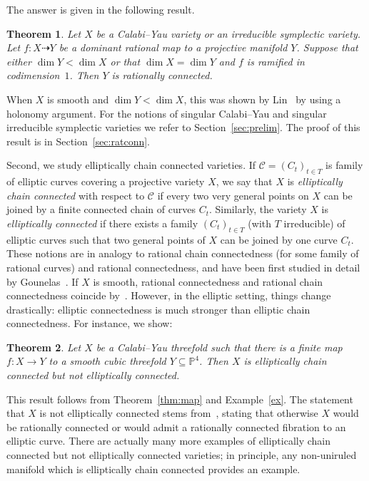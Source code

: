 \documentclass[11pt]{article}
\newtheorem{theo}{Theorem}[section]
\theoremstyle{definition}
\numberwithin{equation}{section}
\numberwithin{figure}{section}
\numberwithin{table}{section}
\newcommand{\PS}{\mathbb{P}}
\newcommand\sC{\mathcal{C}}
\begin{document}
The answer is given in the following result.

\begin{theo}\label{thm:main1}
Let $X$ be a Calabi--Yau variety or an irreducible symplectic variety. Let $f\colon X \dasharrow Y$ be a dominant rational map to a projective manifold $Y$. Suppose that either $\dim Y < \dim X$ or that $\dim X = \dim Y$ and $f$ is ramified in codimension~$1$. Then $Y$ is rationally connected.
\end{theo}

When $X$ is smooth and $\dim Y < \dim X$, this was shown by Lin~\cite[Theorem~1.4]{Lin15} by using a holonomy argument. For the notions of singular Calabi--Yau and singular irreducible symplectic varieties we refer to Section~\ref{sec:prelim}. The proof of this result is in Section~\ref{sec:ratconn}.


Second, we study elliptically chain connected varieties. If $\sC = (C_t)_{t\in T}$ is family of elliptic curves covering a projective variety $X$, we say that $X$ is \emph{elliptically chain connected} with respect to $\sC$ if every two very general points on $X$ can be joined by a finite connected chain of curves $C_t$. Similarly, the variety $X$ is \emph{elliptically connected} if there exists a family $(C_t)_{t\in T}$ (with $T$ irreducible) of elliptic curves such that two general points of $X$ can be joined by one curve $C_t$. These notions are in analogy to rational chain connectedness (for some family of rational curves) and rational connectedness, and have been first studied in detail by Gounelas~\cite{Gou16}. If $X$ is smooth, rational connectedness and rational chain connectedness coincide by~\cite[2.1]{KMM92}. However, in the elliptic setting, things change drastically: elliptic connectedness is much stronger than elliptic chain connectedness. For instance, we show:

\begin{theo}\label{thm:main1.2}
Let $X$ be a Calabi--Yau threefold such that there is a finite map $f \colon X \to Y$ to a smooth cubic threefold $Y \subseteq \PS^4$. Then $X$ is elliptically chain connected but not elliptically connected.
\end{theo}

This result follows from Theorem~\ref{thm:map} and Example~\ref{ex}. The statement that $X$ is not elliptically connected stems from~\cite[Theorem~6.2]{Gou16}, stating that otherwise $X$ would be rationally connected or would admit a rationally connected fibration to an elliptic curve. There are actually many more examples of elliptically chain connected but not elliptically connected varieties; in principle, any non-uniruled manifold which is elliptically chain connected provides an example.
\end{document}
